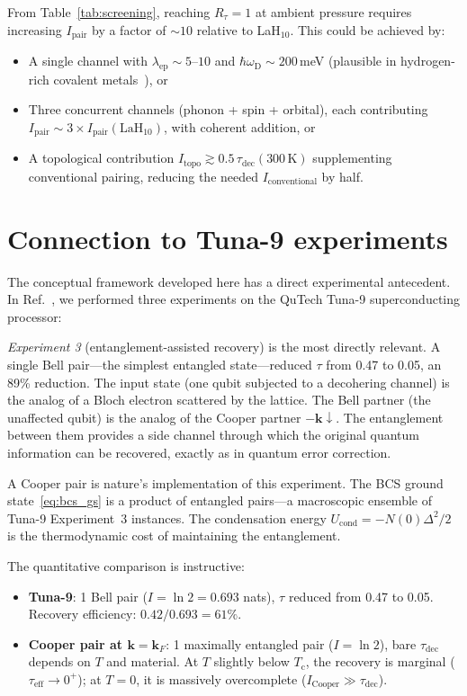 \documentclass[prb,twocolumn,superscriptaddress,longbibliography,floatfix]{revtex4-2}
\newcommand{\tauasym}{\tau}
\newcommand{\taueff}{\tauasym_{\mathrm{eff}}}
\newcommand{\taudec}{\tauasym_{\mathrm{dec}}}
\newcommand{\Icoop}{I_{\mathrm{Cooper}}}
\newcommand{\Ipair}{I_{\mathrm{pair}}}
\newcommand{\Rtau}{R_{\tauasym}}
\newcommand{\Tc}{T_{\mathrm{c}}}
\newcommand{\oD}{\omega_{\mathrm{D}}}
\begin{document}
From Table~\ref{tab:screening}, reaching $\Rtau = 1$ at
ambient pressure requires increasing $\Ipair$ by a factor
of $\sim 10$ relative to LaH$_{10}$.  This could be achieved by:
\begin{itemize}
\item A single channel with $\lambda_{\mathrm{ep}} \sim 5$--$10$
  and $\hbar\oD \sim 200\,$meV (plausible in hydrogen-rich
  covalent metals~\cite{Zurek2019}), or
\item Three concurrent channels (phonon + spin + orbital),
  each contributing $\Ipair \sim 3 \times \Ipair(\text{LaH}_{10})$,
  with coherent addition, or
\item A topological contribution $I_{\mathrm{topo}} \gtrsim
  0.5\, \taudec(300\,\mathrm{K})$ supplementing conventional
  pairing, reducing the needed $I_{\mathrm{conventional}}$ by
  half.
\end{itemize}

\section{Connection to Tuna-9 experiments}
\label{sec:tuna9}

The conceptual framework developed here has a direct experimental
antecedent.  In Ref.~\cite{Huang2026exp}, we performed three
experiments on the QuTech Tuna-9 superconducting processor:

\textit{Experiment 3} (entanglement-assisted recovery) is the
most directly relevant.  A single Bell pair---the simplest
entangled state---reduced $\tauasym$ from 0.47 to 0.05,
an 89\% reduction.  The input state (one qubit subjected to a
decohering channel) is the analog of a Bloch electron scattered
by the lattice.  The Bell partner (the unaffected qubit) is the
analog of the Cooper partner $-\bm{k}\!\downarrow$.  The
entanglement between them provides a side channel through which
the original quantum information can be recovered, exactly as
in quantum error correction.

A Cooper pair is nature's implementation of this experiment.
The BCS ground state~\eqref{eq:bcs_gs} is a product of entangled
pairs---a macroscopic ensemble of Tuna-9 Experiment~3 instances.
The condensation energy $U_{\mathrm{cond}} = -N(0)\Delta^2/2$
is the thermodynamic cost of maintaining the entanglement.

The quantitative comparison is instructive:
\begin{itemize}
\item \textbf{Tuna-9}: 1 Bell pair ($I = \ln 2 = 0.693$ nats),
  $\tauasym$ reduced from 0.47 to 0.05.
  Recovery efficiency: $0.42/0.693 = 61\%$.
\item \textbf{Cooper pair at $\bm{k} = \bm{k}_F$}:
  1 maximally entangled pair ($I = \ln 2$),
  bare $\taudec$ depends on $T$ and material.
  At $T$ slightly below $\Tc$, the recovery is marginal
  ($\taueff \to 0^+$); at $T = 0$, it is massively overcomplete
  ($\Icoop \gg \taudec$).
\end{itemize}
\end{document}
